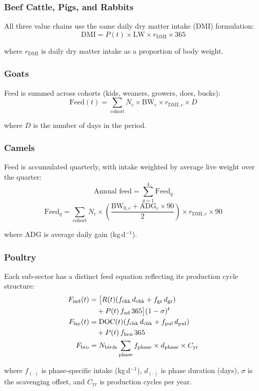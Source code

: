 \subsubsection{Beef Cattle, Pigs, and Rabbits}

All three value chains use the same daily dry matter intake (DMI) formulation:
\begin{equation}
\mathrm{DMI} = P(t) \times \mathrm{LW} \times r_{\mathrm{DMI}} \times 365
\end{equation}

where $r_{\mathrm{DMI}}$ is daily dry matter intake as a proportion of body weight.

\subsubsection{Goats}

Feed is summed across cohorts (kids, weaners, growers, does, bucks):
\begin{equation}
\text{Feed}(t) = \sum_{\text{cohort}} N_c \times \mathrm{BW}_c \times r_{\mathrm{DMI},c} \times D
\end{equation}

where $D$ is the number of days in the period.

\subsubsection{Camels}

Feed is accumulated quarterly, with intake weighted by average live weight over the quarter:
\begin{equation}
\text{Annual feed} = \sum_{q=1}^{4} \text{Feed}_q
\end{equation}
\begin{equation}
\text{Feed}_q = \sum_{\text{cohort}} N_c \times \left(\frac{\mathrm{BW}_{0,c} + \mathrm{ADG}_c \times 90}{2}\right) \times r_{\mathrm{DMI},c} \times 90
\end{equation}

where $\mathrm{ADG}$ is average daily gain (kg\,d$^{-1}$).

\subsubsection{Poultry}

Each sub-sector has a distinct feed equation reflecting its production cycle structure:
\begin{align}
F_{\mathrm{ind}}(t) &= \bigl[R(t)(f_{\mathrm{chk}}\,d_{\mathrm{chk}} + f_{\mathrm{gr}}\,d_{\mathrm{gr}}) \notag \\
                    &\quad + P(t)\,f_{\mathrm{ad}}\,365\bigr](1-\sigma)^t \\
F_{\mathrm{lay}}(t) &= \mathrm{DOC}(t)(f_{\mathrm{chk}}\,d_{\mathrm{chk}} + f_{\mathrm{pul}}\,d_{\mathrm{pul}}) \notag \\
                    &\quad + P(t)\,f_{\mathrm{hen}}\,365 \\
F_{\mathrm{bro}}    &= N_{\mathrm{birds}} \sum_{\text{phase}} f_{\text{phase}} \times d_{\text{phase}} \times C_{\mathrm{yr}}
\end{align}

where $f_{(\cdot)}$ is phase-specific intake (kg\,d$^{-1}$), $d_{(\cdot)}$ is phase duration (days), $\sigma$ is the scavenging offset, and $C_{\mathrm{yr}}$ is production cycles per year.